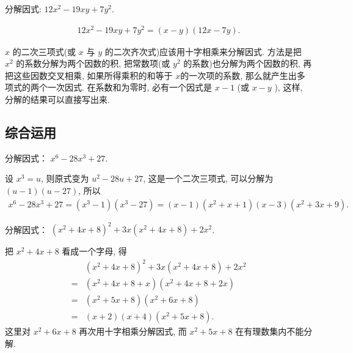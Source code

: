 \begin{example}
	分解因式: $12 x^{2}-19 x y+7 y^{2}$.
\end{example}
\begin{solution}
	\begin{align*}
		12 x^{2}-19 x y+7 y^{2}=(x-y)(12 x-7 y) .
	\end{align*}
\end{solution}
\begin{note}
	$x$ 的二次三项式(或 $x$ 与 $y$ 的二次齐次式)应该用十字相乘来分解因式. 方法是把 $x^{2}$ 的系数分解为两个因数的积, 把常数项(或 $y^{2}$ 的系数)也分解为两个因数的积, 再把这些因数交叉相乘, 如果所得乘积的和等于 $x$的一次项的系数, 那么就产生出多项式的两个一次因式. 在系数和为零时, 必有一个因式是 $x-1$ (或 $x-y$ ), 这样, 分解的结果可以直接写出来.
\end{note}

\subsection{综合运用}
\begin{example}[换元]
	分解因式： $x^{6}-28 x^{3}+27.$
\end{example}
\begin{solution}
	设 $x^{3}=u$, 则原式变为 $u^{2}-28 u+27$, 这是一个二次三项式, 可以分解为 $(u-1)(u-27)$, 所以
	\begin{align*}
		x^{6}-28 x^{3}+27=(x^{3}-1)(x^{3}-27)=(x-1)(x^{2}+x+1)(x-3)(x^{2}+3 x+9).
	\end{align*}
\end{solution}

\begin{example}
	分解因式： $\left(x^{2}+4 x+8\right)^{2}+3 x\left(x^{2}+4 x+8\right)+2 x^{2}$.
\end{example}
\begin{solution}
	把 $x^{2}+4 x+8$ 看成一个字母, 得
	\begin{align*}
		  & \left(x^{2}+4 x+8\right)^{2}+3 x\left(x^{2}+4 x+8\right)+2 x^{2} \\
		= & \left(x^{2}+4 x+8+x\right)\left(x^{2}+4 x+8+2 x\right)           \\
		= & \left(x^{2}+5 x+8\right)\left(x^{2}+6 x+8\right)                 \\
		= & (x+2)(x+4)\left(x^{2}+5 x+8\right) .
	\end{align*}
	这里对 $x^{2}+6 x+8$ 再次用十字相乘分解因式, 而 $x^{2}+5 x+8$ 在有理数集内不能分解.
\end{solution}

